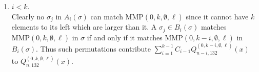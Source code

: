 \documentclass[
final,nomarks
]{dmtcs-episciences}
\newcommand{\Qmmn}[2]{Q_{#2,132}^{(#1)}(x)}
\newcommand{\MMP}{\mathrm{MMP}}
\begin{document}
\begin{enumerate}[{\bf Case }\bf 1.]
	\item \begin{math}i < k\end{math}. \\
	Clearly no \begin{math}\sigma_j\end{math} in \begin{math}A_i(\sigma) \end{math} can match \begin{math}\MMP(0,k,\emptyset,\ell)\end{math} since it cannot 
	have \begin{math}k\end{math} elements to its left which are larger than it. A \begin{math}\sigma_j \in B_i(\sigma)\end{math} 
	matches  \begin{math}\MMP(0,k,\emptyset,\ell)\end{math} in \begin{math}\sigma\end{math} if and only if it matches 
	\begin{math}\MMP(0,k-i,\emptyset,\ell)\end{math} in \begin{math}B_i(\sigma)\end{math}.  Thus such 
	permutations contribute \begin{math}\sum_{i=1}^{k-1}C_{i-1}\Qmmn{0,k-i,\emptyset,\ell}{n-i}\end{math} to 
	\begin{math}\Qmmn{0,k,\emptyset,\ell}{n}\end{math}. 
	

\end{enumerate}
\end{document}
